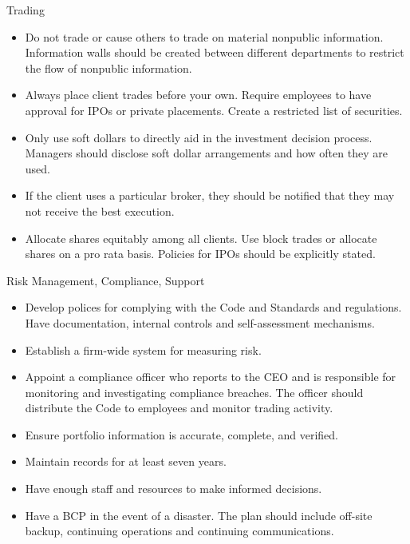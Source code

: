 \documentclass[../custom]{flashcards}
\begin{document}
\begin{flashcard}{Trading}
    \begin{itemize}
        \item Do not trade or cause others to trade on material nonpublic information. Information walls should be created between different departments to restrict the flow of nonpublic information.
        \item Always place client trades before your own. Require employees to have approval for IPOs or private placements. Create a restricted list of securities.
        \item Only use soft dollars to directly aid in the investment decision process. Managers should disclose soft dollar arrangements and how often they are used.
        \item If the client uses a particular broker, they should be notified that they may not receive the best execution.
        \item Allocate shares equitably among all clients. Use block trades or allocate shares on a pro rata basis. Policies for IPOs should be explicitly stated.
    \end{itemize}
\end{flashcard}

\begin{flashcard}{Risk Management, Compliance, Support}
    \begin{itemize}
        \item Develop polices for complying with the Code and Standards and regulations. Have documentation, internal controls and self-assessment mechanisms.
        \item Establish a firm-wide system for measuring risk.
        \item Appoint a compliance officer who reports to the CEO and is responsible for monitoring and investigating compliance breaches. The officer should distribute the Code to employees and monitor trading activity.
        \item Ensure portfolio information is accurate, complete, and verified.
        \item Maintain records for at least seven years.
        \item Have enough staff and resources to make informed decisions.
        \item Have a BCP in the event of a disaster. The plan should include off-site backup, continuing operations and continuing communications.
    \end{itemize}
\end{flashcard}
\end{document}
